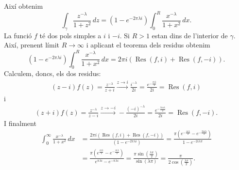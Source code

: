 \documentclass[12pt]{article}
\numberwithin{table}{section}
\numberwithin{figure}{section}
\numberwithin{equation}{section}
\DeclareMathOperator{\Res}{Res}
\begin{document}
Així obtenim
\begin{equation*}
	\int_\gamma \frac{z^{-\lambda}}{1 + z^2} \, dz = (1 - e^{-2\pi\lambda i}) \int_0^R \frac{x^{-\lambda}}{1 + x^2} \, dx.
\end{equation*}
La funció \( f \) té dos pols simples a \( i \) i \( -i \). Si \( R > 1 \) estan dins de l'interior de \( \gamma \). Així, prenent límit \( R \to \infty \) i aplicant el teorema dels residus obtenim
\begin{equation*}
	(1 - e^{-2\pi\lambda i}) \int_0^R \frac{x^{-\lambda}}{1 + x^2} \, dx = 2\pi i (\Res(f,i) + \Res(f,-i)).
\end{equation*}
Calculem, doncs, els dos residus:
\begin{align*}
	(z - i)f(z) = \frac{z^{-\lambda}}{z + i} \xrightarrow{z \to i} \frac{i^{-\lambda}}{2i} = \frac{e^{-\frac{i\pi\lambda}{2}}}{2i} = \Res(f,i)
\end{align*}
i
\begin{align*}
	(z + i)f(z) = \frac{z^{-\lambda}}{z - i} \xrightarrow{z \to -i} -\frac{(-i)^{-\lambda}}{2i} = \frac{e^{-\frac{3i\pi\lambda}{2}}}{2i} = \Res(f,-i).
\end{align*}
I finalment
\begin{align*}
	\int_0^\infty \frac{x^{-\lambda}}{1 + x^2} \, dx & = \frac{2\pi i(\Res(f,i) + \Res(f,-i))}{(1 - e^{-2\pi\lambda i})} = \frac{\pi(e^{-\frac{i\pi\lambda}{2}} - e^{-\frac{3i\pi\lambda}{2}})}{1 - e^{-2i\lambda\pi}} \\
																									 & = \frac{\pi(e^{\frac{i\pi\lambda}{2}} - e^{-\frac{i\pi\lambda}{2}})}{e^{\pi\lambda i} - e^{-\pi\lambda i}} = \frac{\pi\sin\left(\frac{\lambda\pi}{2}\right)}{\sin(\lambda \pi)} = \frac{\pi}{2\cos\left(\frac{\lambda\pi}{2}\right)}.
\end{align*}
\end{document}
